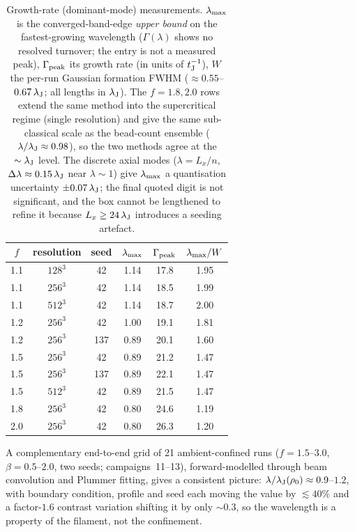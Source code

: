 \documentclass[usenatbib,twoside,twocolumn]{mnras}
\begin{document}
\begin{table}
\caption{Growth-rate (dominant-mode) measurements. $\lambda_{\rm max}$ is the converged-band-edge \emph{upper bound} on the fastest-growing wavelength ($\Gamma(\lambda)$ shows no resolved turnover; the entry is not a measured peak), $\Gamma_{\rm peak}$ its growth rate (in units of $t_{\rm J}^{-1}$), $W$ the per-run Gaussian formation FWHM ($\approx0.55$--$0.67\,\lambda_{\rm J}$; all lengths in $\lambda_{\rm J}$). The $f=1.8,2.0$ rows extend the same method into the supercritical regime (single resolution) and give the same sub-classical scale as the bead-count ensemble ($\lambda/\lambda_{\rm J}\approx0.98$), so the two methods agree at the $\sim\lambda_{\rm J}$ level. The discrete axial modes ($\lambda=L_x/n$, $\Delta\lambda\approx0.15\,\lambda_{\rm J}$ near $\lambda\sim1$) give $\lambda_{\rm max}$ a quantisation uncertainty $\pm0.07\,\lambda_{\rm J}$; the final quoted digit is not significant, and the box cannot be lengthened to refine it because $L_x\geq24\,\lambda_{\rm J}$ introduces a seeding artefact.}
\label{tab:wave}
\footnotesize
\setlength{\tabcolsep}{4pt}
\begin{tabular}{cccccc}
\toprule
$f$ & resolution & seed & $\lambda_{\rm max}$ & $\Gamma_{\rm peak}$ & $\lambda_{\rm max}/W$ \\
\midrule
1.1 & $128^3$ & 42  & 1.14 & 17.8 & 1.95 \\
1.1 & $256^3$ & 42  & 1.14 & 18.5 & 1.99 \\
1.1 & $512^3$ & 42  & 1.14 & 18.7 & 2.00 \\
1.2 & $256^3$ & 42  & 1.00 & 19.1 & 1.81 \\
1.2 & $256^3$ & 137 & 0.89 & 20.1 & 1.60 \\
1.5 & $256^3$ & 42  & 0.89 & 21.2 & 1.47 \\
1.5 & $256^3$ & 137 & 0.89 & 22.1 & 1.47 \\
1.5 & $512^3$ & 42  & 0.89 & 21.5 & 1.47 \\
1.8 & $256^3$ & 42  & 0.80 & 24.6 & 1.19 \\
2.0 & $256^3$ & 42  & 0.80 & 26.3 & 1.20 \\
\bottomrule
\end{tabular}
\end{table}

A complementary end-to-end grid of 21 ambient-confined runs ($f=1.5$--$3.0$, $\beta=0.5$--$2.0$, two seeds; campaigns~11--13), forward-modelled through beam convolution and Plummer fitting, gives a consistent picture: $\lambda/\lambda_{\rm J}(\rho_0)\approx0.9$--$1.2$, with boundary condition, profile and seed each moving the value by $\lesssim40\%$ and a factor-$1.6$ contrast variation shifting it by only $\sim0.3$, so the wavelength is a property of the filament, not the confinement.
\end{document}
